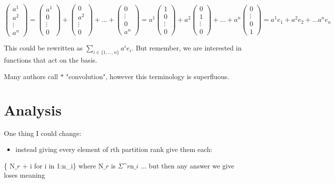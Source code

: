 \documentclass[12pt,a4paper]{article}
\begin{document}
$\begin{pmatrix} a^1 \\ a^2 \\ \vdots \\ a^n \end{pmatrix} = \begin{pmatrix} a^1 \\ 0 \\ \vdots \\ 0 \end{pmatrix} + \begin{pmatrix} 0 \\ a^2 \\ \vdots \\ 0 \end{pmatrix} + \dots + \begin{pmatrix} 0 \\  \vdots \\ 0\\ a^n \end{pmatrix}  = a^1\begin{pmatrix} 1 \\ 0 \\ \vdots \\ 0 \end{pmatrix} + a^2\begin{pmatrix} 0 \\ 1 \\ \vdots \\ 0 \end{pmatrix} + \dots + a^n\begin{pmatrix} 0 \\  \vdots \\ 0\\ 1\end{pmatrix}  = a^1 e_1 + a^2 e_2 + \dots a^n e_n$

This could be rewritten as $\ensuremath{\sum}_{i \ensuremath{\in} \{1,\ensuremath{\ldots},n\} } a^i e_i$. But remember, we are interested in functions that act on the basis.

Many authors call $*$ "convolution", however this terminology is superfluous.

\section{Analysis}
One thing I could change:

\begin{itemize}
\item instead giving every element of rth partition rank  give them each:

\end{itemize}
\{ N\ensuremath{\_r} + i for i in 1:n\_i\}  where N\ensuremath{\_r} is \ensuremath{\Sigma}\ensuremath{\^r}n\ensuremath{\_i} ... but then any answer we give loses meaning
\end{document}
